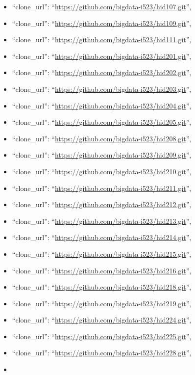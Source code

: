 \begin{itemize}
\item
  ``clone\_url'': ``\url{https://github.com/bigdata-i523/hid107.git}'',
\item
  ``clone\_url'': ``\url{https://github.com/bigdata-i523/hid109.git}'',
\item
  ``clone\_url'': ``\url{https://github.com/bigdata-i523/hid111.git}'',
\item
  ``clone\_url'': ``\url{https://github.com/bigdata-i523/hid201.git}'',
\item
  ``clone\_url'': ``\url{https://github.com/bigdata-i523/hid202.git}'',
\item
  ``clone\_url'': ``\url{https://github.com/bigdata-i523/hid203.git}'',
\item
  ``clone\_url'': ``\url{https://github.com/bigdata-i523/hid204.git}'',
\item
  ``clone\_url'': ``\url{https://github.com/bigdata-i523/hid205.git}'',
\item
  ``clone\_url'': ``\url{https://github.com/bigdata-i523/hid208.git}'',
\item
  ``clone\_url'': ``\url{https://github.com/bigdata-i523/hid209.git}'',
\item
  ``clone\_url'': ``\url{https://github.com/bigdata-i523/hid210.git}'',
\item
  ``clone\_url'': ``\url{https://github.com/bigdata-i523/hid211.git}'',
\item
  ``clone\_url'': ``\url{https://github.com/bigdata-i523/hid212.git}'',
\item
  ``clone\_url'': ``\url{https://github.com/bigdata-i523/hid213.git}'',
\item
  ``clone\_url'': ``\url{https://github.com/bigdata-i523/hid214.git}'',
\item
  ``clone\_url'': ``\url{https://github.com/bigdata-i523/hid215.git}'',
\item
  ``clone\_url'': ``\url{https://github.com/bigdata-i523/hid216.git}'',
\item
  ``clone\_url'': ``\url{https://github.com/bigdata-i523/hid218.git}'',
\item
  ``clone\_url'': ``\url{https://github.com/bigdata-i523/hid219.git}'',
\item
  ``clone\_url'': ``\url{https://github.com/bigdata-i523/hid224.git}'',
\item
  ``clone\_url'': ``\url{https://github.com/bigdata-i523/hid225.git}'',
\item
  ``clone\_url'': ``\url{https://github.com/bigdata-i523/hid228.git}'',
\item

\end{itemize}
